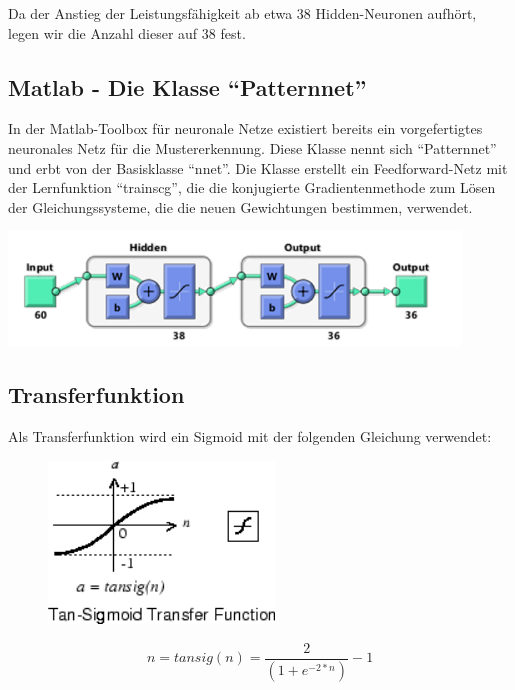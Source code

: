 Da der Anstieg der Leistungsfähigkeit ab etwa $38$ Hidden-Neuronen aufhört,
legen wir die Anzahl dieser auf $38$ fest.

\subsection{Matlab - Die Klasse ``Patternnet''}

In der Matlab-Toolbox für neuronale Netze existiert bereits ein vorgefertigtes
neuronales Netz für die Mustererkennung. Diese Klasse nennt sich ``Patternnet''
und erbt von der Basisklasse ``nnet''. Die Klasse erstellt ein Feedforward-Netz
mit der Lernfunktion ``trainscg'', die die konjugierte Gradientenmethode zum
Lösen der Gleichungssysteme, die die neuen Gewichtungen bestimmen, verwendet.


  \begin{center}
    \includegraphics[width=12cm]{res/PatternNet-Aufbau.png}
  \end{center}


\subsection{Transferfunktion}
 Als Transferfunktion wird ein Sigmoid mit der folgenden Gleichung verwendet:

\begin{figure}
  \begin{center}
    \includegraphics[width=6cm]{res/tansig.png}
  \end{center}
\end{figure}

\begin{equation}
n = tansig(n) =  \frac{2}{(1 + e^{-2*n})} - 1
\end{equation}

